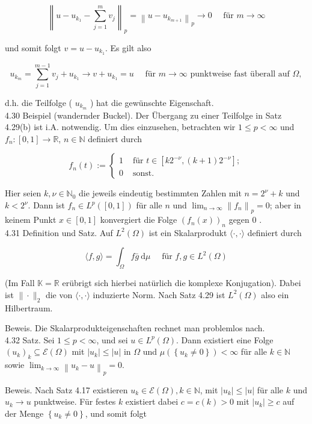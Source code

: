 \documentclass[10pt, letterpaper]{article}
\begin{document}
$$
\left\|u-u_{k_{1}}-\sum_{j=1}^{m} v_{j}\right\|_{p}=\left\|u-u_{k_{m+1}}\right\|_{p} \rightarrow 0 \quad \text { für } m \rightarrow \infty
$$

und somit folgt $v=u-u_{k_{1}}$. Es gilt also

$$
u_{k_{m}}=\sum_{j=1}^{m-1} v_{j}+u_{k_{1}} \rightarrow v+u_{k_{1}}=u \quad \text { für } m \rightarrow \infty \text { punktweise fast überall auf } \Omega,
$$

d.h. die Teilfolge ( $u_{k_{m}}$ ) hat die gewünschte Eigenschaft.\\
4.30 Beispiel (wandernder Buckel). Der Übergang zu einer Teilfolge in Satz 4.29(b) ist i.A. notwendig. Um dies einzusehen, betrachten wir $1 \leq p<\infty$ und $f_{n}:[0,1] \rightarrow \mathbb{R}$, $n \in \mathbb{N}$ definiert durch

$$
f_{n}(t):= \begin{cases}1 & \text { für } t \in\left[k 2^{-\nu},(k+1) 2^{-\nu}\right] ; \\ 0 & \text { sonst. }\end{cases}
$$

Hier seien $k, \nu \in \mathbb{N}_{0}$ die jeweils eindeutig bestimmten Zahlen mit $n=2^{\nu}+k$ und $k<2^{\nu}$. Dann ist $f_{n} \in L^{p}([0,1])$ für alle $n$ und $\lim _{n \rightarrow \infty}\left\|f_{n}\right\|_{p}=0$; aber in keinem Punkt $x \in[0,1]$ konvergiert die Folge $\left(f_{n}(x)\right)_{n}$ gegen 0 .\\
4.31 Definition und Satz. Auf $L^{2}(\Omega)$ ist ein Skalarprodukt $\langle\cdot, \cdot\rangle$ definiert durch

$$
\langle f, g\rangle=\int_{\Omega} f \bar{g} \mathrm{~d} \mu \quad \text { für } f, g \in L^{2}(\Omega)
$$

(Im Fall $\mathbb{K}=\mathbb{R}$ erübrigt sich hierbei natürlich die komplexe Konjugation). Dabei ist $\|\cdot\|_{2}$ die von $\langle\cdot, \cdot\rangle$ induzierte Norm. Nach Satz 4.29 ist $L^{2}(\Omega)$ also ein Hilbertraum.

Beweis. Die Skalarprodukteigenschaften rechnet man problemlos nach.\\
4.32 Satz. Sei $1 \leq p<\infty$, und sei $u \in L^{p}(\Omega)$. Dann existiert eine Folge $\left(u_{k}\right)_{k} \subseteq \mathcal{E}(\Omega)$ mit $\left|u_{k}\right| \leq|u|$ in $\Omega$ und $\mu\left(\left\{u_{k} \neq 0\right\}\right)<\infty$ für alle $k \in \mathbb{N}$ sowie $\lim _{k \rightarrow \infty}\left\|u_{k}-u\right\|_{p}=0$.

Beweis. Nach Satz 4.17 existieren $u_{k} \in \mathcal{E}(\Omega), k \in \mathbb{N}$, mit $\left|u_{k}\right| \leq|u|$ für alle $k$ und $u_{k} \rightarrow u$ punktweise. Für festes $k$ existiert dabei $c=c(k)>0$ mit $\left|u_{k}\right| \geq c$ auf der Menge $\left\{u_{k} \neq 0\right\}$, und somit folgt
\end{document}
